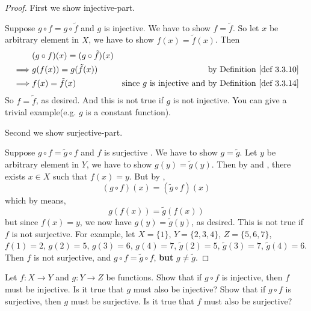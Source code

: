 \begin{proof}
First we show injective-part.

Suppose \(g \circ f = g \circ \tilde{f}\) and \(g\) is injective. We have to show \(f = \tilde{f}\).
So let \(x\) be arbitrary element in \(X\), we have to show \(f(x) = \tilde{f}(x)\).
Then
\begin{align*}
         & (g \circ f)(x) = (g \circ \tilde{f})(x) \\
    \implies & g(f(x)) = g(\tilde{f}(x)) & \text{by \DEF{3.3.10}} \\
    \implies & f(x) = \tilde{f}(x)       & \text {since \(g\) is injective and by \DEF{3.3.14}}
\end{align*}
So \(f = \tilde{f}\), as desired.
And this is not true if \(g\) is not injective.
You can give a trivial example(e.g. \(g\) is a constant function).

Second we show surjective-part.

Suppose \(g \circ f = \tilde{g} \circ f\)  and \(f\) is surjective .
We have to show \(g = \tilde{g}\).
Let \(y\) be arbitrary element in \(Y\), we have to show \(g(y) = \tilde{g}(y)\).
Then by  and , there exists \(x \in X\) such that \(f(x) = y\).
But by ,
\[
    (g \circ f)(x) = (\tilde{g} \circ f)(x)
\]
which by  means,
\[
    g(f(x)) = \tilde{g}(f(x))
\]
but since \(f(x) = y\), we now have \(g(y) = \tilde{g}(y)\), as desired.
This is not true if \(f\) is not surjective.
For example,
let \(X = \{1\}\), \(Y = \{2, 3, 4\}\), \(Z = \{5, 6, 7\}\), 
\(f(1) = 2\),
\(g(2) = 5\), \(g(3) = 6\), \(g(4) = 7\),
\(\tilde{g}(2) = 5\), \(\tilde{g}(3) = 7\), \(\tilde{g}(4) = 6\).
Then \(f\) is not surjective, and \(g \circ f = \tilde{g} \circ f\), \textbf{but} \(g \neq \tilde{g}\).
\end{proof}

\begin{exercise} \label{exercise 3.3.5}
Let \(f : X \rightarrow Y\) and \(g : Y \rightarrow Z\) be functions.
Show that if \(g \circ f\) is injective, then \(f\) must be injective. 
Is it true that \(g\) must also be injective? 
Show that if \(g \circ f\) is surjective, then \(g\) must be surjective. 
Is it true that \(f\) must also be surjective? 
\end{exercise}

